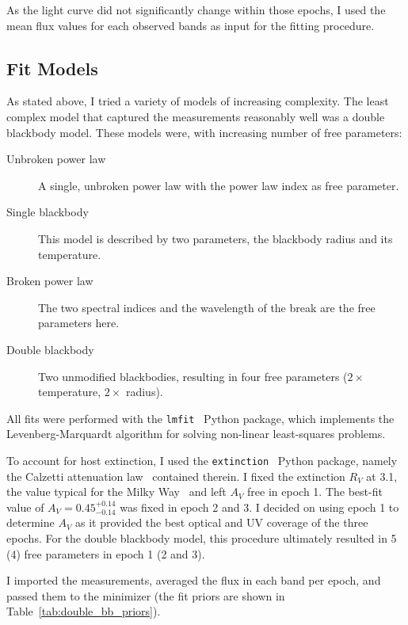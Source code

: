 As the light curve did not significantly change within those epochs, I used the mean flux values for each observed bands as input for the fitting procedure.

\subsection{Fit Models}\label{fitmodels}
As stated above, I tried a variety of models of increasing complexity. The least complex model that captured the measurements reasonably well was a double blackbody model. These models were, with increasing number of free parameters:

\begin{description}
    \item[Unbroken power law] A single, unbroken power law with the power law index as free parameter.
    \item[Single blackbody] This model is described by two parameters, the blackbody radius and its temperature.
    \item[Broken power law] The two spectral indices and the wavelength of the break are the free parameters here.
    \item[Double blackbody] Two unmodified blackbodies, resulting in four free parameters ($2 \times$ temperature, $2 \times$ radius).
\end{description}

All fits were performed with the \texttt{lmfit}~ Python package, which implements the Levenberg-Marquardt algorithm for solving non-linear least-squares problems.

To account for host extinction, I used the \texttt{extinction}~ Python package, namely the Calzetti attenuation law~ contained therein. I fixed the extinction $R_V$ at 3.1, the value typical for the Milky Way~ and left $A_V$ free in epoch 1. The best-fit value of $A_V=0.45^{+0.14}_{-0.14}$ was fixed in epoch 2 and 3. I decided on using epoch 1 to determine $A_V$ as it provided the best optical and UV coverage of the three epochs. For the double blackbody model, this procedure ultimately resulted in 5 (4) free parameters in epoch 1 (2 and 3).

I imported the measurements, averaged the flux in each band per epoch, and passed them to the minimizer (the fit priors are shown in Table~\ref{tab:double_bb_priors}).

